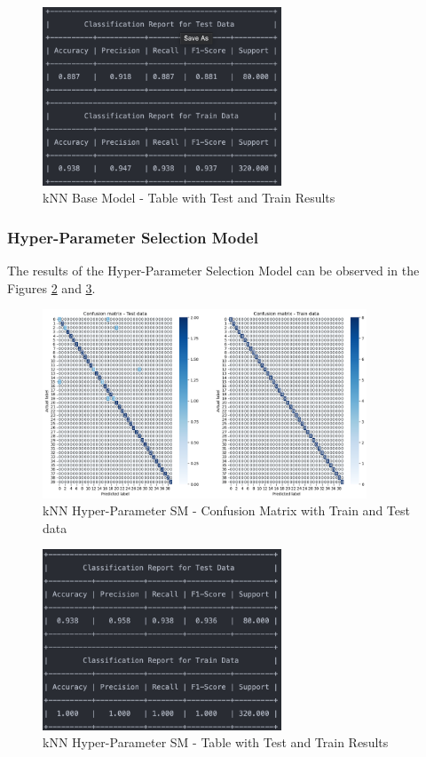 \documentclass[conference]{IEEEtran}
\begin{document}
\begin{figure}[H]
    \centering
    \includegraphics[width=2.8in]{k-NN/r_1.png}%
    \caption{kNN Base Model - Table with Test and Train Results}%
    \label{fig:conf_knn_r_1}%
\end{figure}

\subsubsection{Hyper-Parameter Selection Model}
The results of the Hyper-Parameter Selection Model can be observed in the Figures \ref{fig:conf_knn_2} and \ref{fig:conf_knn_r_2}.

\begin{figure}[H]
    \centering
    \includegraphics[width=3.8in]{k-NN/2.png}%
    \caption{kNN Hyper-Parameter SM - Confusion Matrix with Train and Test data}%
    \label{fig:conf_knn_2}%
\end{figure}

\begin{figure}[H]
    \centering
    \includegraphics[width=2.8in]{k-NN/r_2.png}%
    \caption{kNN Hyper-Parameter SM - Table with Test and Train Results}%
    \label{fig:conf_knn_r_2}%
\end{figure}
\end{document}

